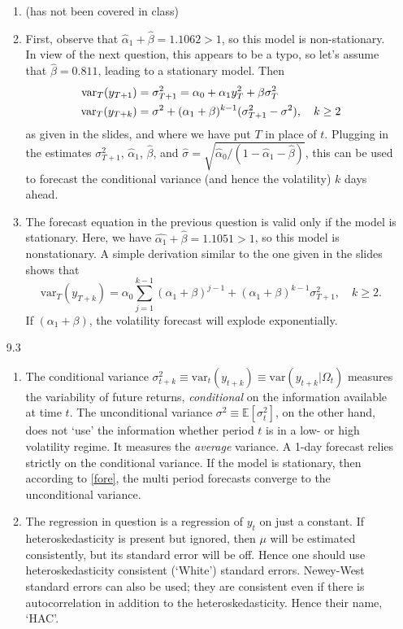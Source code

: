 \documentclass[11pt,a4paper]{article}
\begin{document}
\begin{enumerate}
\begin{enumerate}
\item (has not been covered in class)
\item First, observe that $\hat{\alpha}_1+\hat{\beta}=1.1062>1$, so this model is non-stationary. In view of the next question, this appears to be a typo, so let's assume that $\hat{\beta}=0.811$, leading to a stationary model. Then
    \begin{align}
    \text{var}_{T}(y_{T+1})&=\sigma _{T+1}^{2}=\alpha_0+\alpha_1y_{T}^{2}+\beta \sigma _{T}^{2}\notag\\
    \text{var}_{T}(y_{T+k})&=\sigma
^{2}+(\alpha_1 +\beta )^{k-1}(\sigma _{T+1}^{2}-\sigma ^{2}),\quad k\geq 2\label{fore}
\end{align}
as given in the slides, and where we have put $T$ in place of $t$. Plugging in the estimates $\sigma _{T+1}^{2}$, $\hat{\alpha}_1$, $\hat{\beta}$, and $\hat{\sigma}=\sqrt{\hat{\alpha}_0/(1-\hat{\alpha}_1-\hat{\beta})}$, this can be used to forecast the conditional variance (and hence the volatility) $k$ days ahead.
\item  The forecast equation in the previous question is valid only if the model is stationary. Here, we have $\hat{\alpha_1}+\hat{\beta}=1.1051>1$, so this model is nonstationary. A simple derivation similar to the one given in the slides shows that
  \[\text{var}_{T}(y_{T+k})=\alpha_0\sum_{j=1}^{k-1}(\alpha_1+\beta)^{j-1}+(\alpha_1 +\beta )^{k-1}\sigma _{T+1}^{2}, \quad k\geq 2.
\]
If $(\alpha_1 +\beta )$, the volatility forecast will explode exponentially.
\end{enumerate}
\item[9.3]
\begin{enumerate}
\item The conditional variance $\sigma^2_{t+k}\equiv\mathrm{var}_t(y_{t+k})\equiv\mathrm{var}(y_{t+k}|\Omega_t)$ measures the variability of future returns, \emph{conditional} on the information available at time $t$. The unconditional variance $\sigma^2\equiv\mathbb{E}[\sigma^2_t]$, on the other hand, does not `use' the information whether period $t$ is in a low- or high volatility regime. It measures the \emph{average} variance.
A 1-day forecast relies strictly on the conditional variance. If the model is stationary, then according to \eqref{fore}, the multi period forecasts converge to the unconditional variance.
\item The regression in question is a regression of $y_t$ on just a constant. If heteroskedasticity is present but ignored, then $\mu$ will be estimated consistently, but its standard error will be off. Hence one should use heteroskedasticity consistent (`White') standard errors. Newey-West standard errors can also be used; they are consistent even if there is autocorrelation in addition to the heteroskedasticity. Hence their name, `HAC'.

\end{enumerate}
\end{enumerate}
\end{document}
